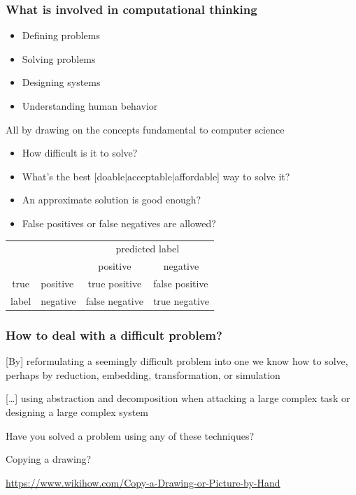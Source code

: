 \documentclass[xcolor=x11names,handout]{beamer}
\newcommand{\light}[1]{\textcolor{gray}{#1}}
\begin{document}
\begin{frame}
\frametitle{What is involved in computational thinking}

\begin{itemize}
 \item Defining problems				\pause 
 \item Solving problems					\pause
 \item Designing systems				\pause
 \item Understanding human behavior
\end{itemize}
\bigskip

All by drawing on the concepts fundamental to computer science
\bigskip 									\pause

\begin{itemize}
 \item How difficult is it to solve?			\pause
 \item What’s the best [doable$\mid$acceptable$\mid$affordable] way to solve it?	
\pause
 \item An approximate solution is good enough?	\pause
 \item False positives or false negatives are allowed?	\pause
\end{itemize}
\begin{center}
\begin{tabular}{cccc}
                 &              & \multicolumn{2}{c}{\alert{predicted label}}   
\\
                 &              &  positive     & negative      \\\cline{3-4}
\alert{true}& \multicolumn{1}{l|}{positive}& true positive      & 
\multicolumn{1}{l|}{false positive}\\
\alert{label}& \multicolumn{1}{l|}{negative}& false negative& 
\multicolumn{1}{l|}{true negative} \\\cline{3-4}
\end{tabular}
\end{center}
\end{frame}

\begin{frame}
\frametitle{How to deal with a difficult problem?}

[By] reformulating a seemingly difficult problem into one we know how to solve, 
perhaps by reduction, embedding, transformation, or simulation	\pause
\medskip

[\ldots] using abstraction and decomposition when attacking a large complex task 
or designing a large complex system
\bigskip 		\pause

Have \alert{you} solved a problem using any of these techniques?	\pause
\bigskip					\pause

\alert{Copying a drawing?}

\light{\url{https://www.wikihow.com/Copy-a-Drawing-or-Picture-by-Hand}}
\end{frame}
\end{document}
